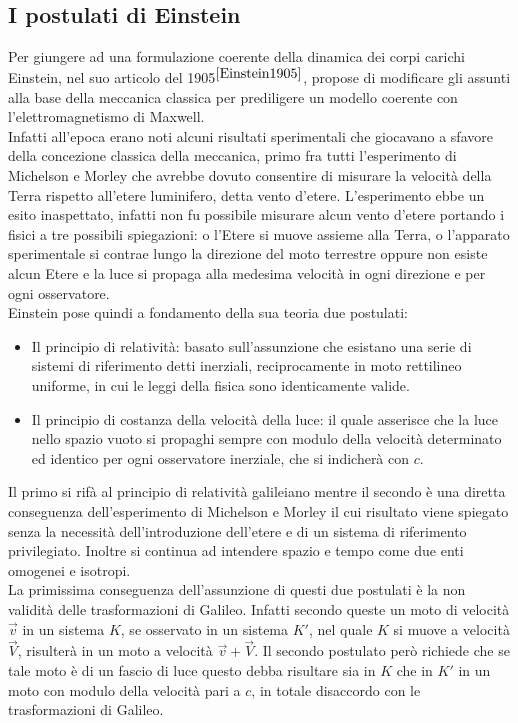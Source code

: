 \subsection{I postulati di Einstein}\label{Sec:postulati}
Per giungere ad una formulazione coerente della dinamica dei corpi carichi Einstein, nel suo articolo del 1905$^{\cite{Einstein1905}}$, propose di modificare gli assunti alla base della meccanica classica per prediligere un modello coerente con l'elettromagnetismo di Maxwell.\\Infatti all'epoca erano noti alcuni risultati sperimentali che giocavano a sfavore della concezione classica della meccanica, primo fra tutti l'esperimento di Michelson e Morley che avrebbe dovuto consentire di misurare la velocità della Terra rispetto all'etere luminifero, detta vento d'etere. L'esperimento ebbe un esito inaspettato, infatti non fu possibile misurare alcun vento d'etere portando i fisici a tre possibili spiegazioni: o l'Etere si muove assieme alla Terra, o l'apparato sperimentale si contrae lungo la direzione del moto terrestre oppure non esiste alcun Etere e la luce si propaga alla medesima velocità in ogni direzione e per ogni osservatore.\\

Einstein pose quindi a fondamento della sua teoria due postulati:
\begin{itemize}
    \item Il principio di relatività: basato sull'assunzione che esistano  una serie di sistemi di riferimento detti inerziali, reciprocamente in moto rettilineo uniforme, in cui le leggi della fisica sono identicamente valide.
    \item Il principio di costanza della velocità della luce: il quale asserisce che la luce nello spazio vuoto si propaghi sempre con modulo della velocità determinato ed identico per ogni osservatore inerziale, che si indicherà con $c$. 
\end{itemize}
Il primo si rifà al principio di relatività galileiano mentre il secondo è una diretta conseguenza dell'esperimento di Michelson e Morley il cui risultato viene spiegato senza la necessità dell'introduzione dell'etere e di un sistema di riferimento privilegiato. Inoltre si continua ad intendere spazio e tempo come due enti omogenei e isotropi.\\

La primissima conseguenza dell'assunzione di questi due postulati è la non validità delle trasformazioni di Galileo. Infatti secondo queste un moto di velocità $\vec{v}$ in un sistema $K$, se osservato in un sistema $K'$, nel quale $K$ si muove a velocità $\vec{V}$, risulterà in un moto a velocità $\vec{v}+\vec{V}$. Il secondo postulato però richiede che se tale moto è di un fascio di luce questo debba risultare sia in $K$ che in $K'$ in un moto con modulo della velocità pari a $c$, in totale disaccordo con le trasformazioni di Galileo.\\


